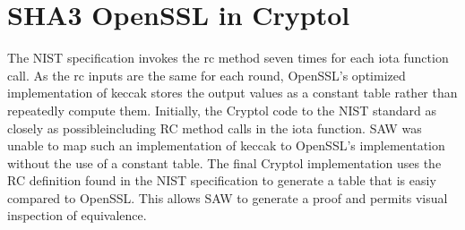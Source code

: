 \section{SHA3 OpenSSL in Cryptol}\label{sec:openssl}
The NIST specification invokes the rc method seven times for each iota function call.
As the rc inputs are the same for each round, OpenSSL's optimized implementation of keccak stores the output values as a constant table rather than repeatedly compute them. 
Initially, the Cryptol code to the NIST standard as closely as possible\textemdash including RC method calls in the iota function. 
SAW was unable to map such an implementation of keccak to OpenSSL's implementation without the use of a constant table. 
The final Cryptol implementation uses the RC definition found in the NIST specification to generate a table that is easiy compared to OpenSSL. 
This allows SAW to generate a proof and permits visual inspection of equivalence.